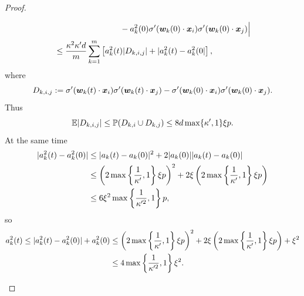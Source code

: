 \documentclass{article}
\begin{document}
\begin{proof}
\begin{enumerate}[(a)]
\begin{enumerate}[(i)]
\begin{equation*}
\begin{aligned}
                                 & \quad\quad\quad\quad\quad\quad\quad\quad -a_k^2(0)\sigma'(\bm{w}_k(0)\cdot\bm{x}_i)\sigma'(\bm{w}_k(0)\cdot\bm{x}_j)\Big|                        \\
                                 & \leq \frac{\kappa^2\kappa'd}{m}\sum_{k=1}^m\left[a_k^2(t)\lvert D_{k,i,j}\rvert+|a_k^2(t)-a_k^2(0|\right],
                            \end{aligned}
                        \end{equation*}
                        where
                        \begin{equation*}
                            D_{k,i,j}:=\sigma'(\bm{w}_k(t)\cdot\bm{x}_i)\sigma'(\bm{w}_k(t)\cdot\bm{x}_j)-\sigma'(\bm{w}_k(0)\cdot\bm{x}_i)\sigma'(\bm{w}_k(0)\cdot\bm{x}_j).
                        \end{equation*}
                        Thus
                        \begin{equation*}
                            \mathbb{E}|D_{k,i,j}|\leq\mathbb{P}(D_{k,i}\cup D_{k,j})\leq 8d\max\{\kappa',1\}\xi p.
                        \end{equation*}
                        At the same time
                        \begin{equation*}
                            \begin{aligned}
                                \lvert a_k^2(t)-a_k^2(0)\rvert
                                 & \leq\lvert a_k(t)-a_k(0)\rvert^2+2\lvert a_k(0)\rvert\lvert a_k(t)-a_k(0)\rvert                                                                     \\
                                 & \leq \left(2\max\left\{\frac{1}{\kappa'},1\right\}\xi p\right)^2+2\xi\left(2\max\left\{\frac{1}{\kappa'},1\right\}\xi p\right) \\
                                 & \leq 6\xi^2\max\left\{\frac{1}{\kappa'^2},1\right\}p,
                            \end{aligned}
                        \end{equation*}
                        so
                        \begin{equation*}
                            \begin{aligned}
                                a_k^2(t)\leq \abs{a_k^2(t)-a_k^2(0)}+a_k^2(0)
                                 & \leq \left(2\max\left\{\frac{1}{\kappa'},1\right\}\xi p\right)^2+2\xi\left(2\max\left\{\frac{1}{\kappa'},1\right\}\xi p\right) + \xi^2 \\
                                 & \leq 4\max\left\{\frac{1}{\kappa'^2},1\right\}\xi^2.

\end{aligned}
\end{equation*}
\end{enumerate}
\end{enumerate}
\end{proof}
\end{document}

